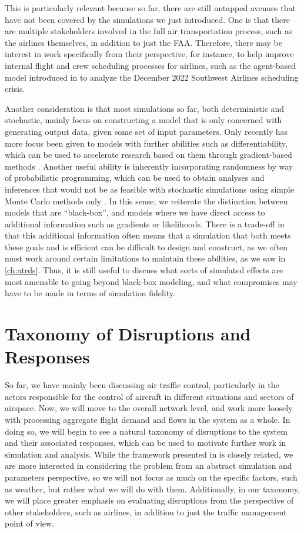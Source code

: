 This is particularly relevant because so far, there are still untapped avenues that have not been covered by the simulations we just introduced. One is that there are multiple stakeholders involved in the full air transportation process, such as the airlines themselves, in addition to just the FAA. Therefore, there may be interest in work specifically from their perspective, for instance, to help improve internal flight and crew scheduling processes for airlines, such as the agent-based model introduced in \cite{michael_peng_probing_2024} to analyze the December 2022 Southwest Airlines scheduling crisis. 

Another consideration is that most simulations so far, both deterministic and stochastic, mainly focus on constructing a model that is only concerned with generating output data, given some set of input parameters. Only recently has more focus been given to models with further abilities such as differentiability, which can be used to accelerate research based on them through gradient-based methods \cite{dawson2024breaking}. Another useful ability is inherently incorporating randomness by way of probabilistic programming, which can be used to obtain analyses and inferences that would not be as feasible with stochastic simulations using simple Monte Carlo methods only \cite{dawson2025rare}. In this sense, we reiterate the distinction between models that are ``black-box'', and models where we have direct access to additional information such as gradients or likelihoods. There is a trade-off in that this additional information often means that a simulation that both meets these goals and is efficient can be difficult to design and construct, as we often must work around certain limitations to maintain these abilities, as we saw in \cref{ch:atrds}. Thus, it is still useful to discuss what sorts of simulated effects are most amenable to going beyond black-box modeling, and what compromises may have to be made in terms of simulation fidelity.

\section{Taxonomy of Disruptions and Responses}
\label{sec:atm-taxonomy}

So far, we have mainly been discussing air traffic control, particularly in the actors responsible for the control of aircraft in different situations and sectors of airspace. Now, we will move to the overall network level, and work more loosely with processing aggregate flight demand and flows in the system as a whole. In doing so, we will begin to see a natural taxonomy of disruptions to the system and their associated responses, which can be used to motivate further work in simulation and analysis. While the framework presented in \cite{enea_analysis_2024} is closely related, we are more interested in considering the problem from an abstract simulation and parameters perspective, so we will not focus as much on the specific factors, such as weather, but rather what we will do with them. Additionally, in our taxonomy, we will place greater emphasis on evaluating disruptions from the perspective of other stakeholders, such as airlines, in addition to just the traffic management point of view.

